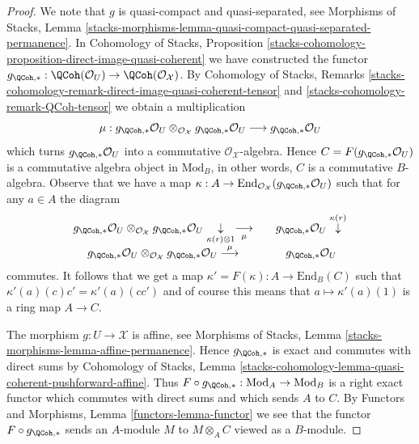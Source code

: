 \begin{proof}
We note that $g$ is quasi-compact and quasi-separated, see
Morphisms of Stacks, Lemma
\ref{stacks-morphisms-lemma-quasi-compact-quasi-separated-permanence}.
In Cohomology of Stacks, Proposition
\ref{stacks-cohomology-proposition-direct-image-quasi-coherent}
we have constructed the functor
$g_{\QCoh, *} : \QCoh(\mathcal{O}_U) \to \QCoh(\mathcal{O}_\mathcal{X})$.
By Cohomology of Stacks, Remarks
\ref{stacks-cohomology-remark-direct-image-quasi-coherent-tensor} and
\ref{stacks-cohomology-remark-QCoh-tensor}
we obtain a multiplication
$$
\mu :
g_{\QCoh, *}\mathcal{O}_U
\otimes_{\mathcal{O}_\mathcal{X}}
g_{\QCoh, *}\mathcal{O}_U
\longrightarrow
g_{\QCoh, *}\mathcal{O}_U
$$
which turns $g_{\QCoh, *}\mathcal{O}_U$ into a commutative
$\mathcal{O}_\mathcal{X}$-algebra. Hence $C = F(g_{\QCoh, *}\mathcal{O}_U)$
is a commutative algebra object in $\text{Mod}_B$, in other words, $C$ is a
commutative $B$-algebra. Observe that we have a map
$\kappa : A \to \text{End}_{\mathcal{O}_\mathcal{X}}(g_{\QCoh, *}\mathcal{O}_U)$
such that for any $a \in A$ the diagram
$$
\begin{array}{ccc}g_{\QCoh, *}\mathcal{O}_U \otimes_{\mathcal{O}_\mathcal{X}}
g_{\QCoh, *}\mathcal{O}_U
\underset{\kappa(r) \otimes 1}{\downarrow}\underset{\mu}{\longrightarrow} &  & g_{\QCoh, *}\mathcal{O}_U \overset{\kappa(r)}{\downarrow} \\ g_{\QCoh, *}\mathcal{O}_U \otimes_{\mathcal{O}_\mathcal{X}}
g_{\QCoh, *}\mathcal{O}_U
\overset{\mu}{\longrightarrow} &  & g_{\QCoh, *}\mathcal{O}_U\end{array}
$$
commutes. It follows that we get a map
$\kappa' = F(\kappa) : A \to \text{End}_B(C)$
such that $\kappa'(a)(c) c' = \kappa'(a)(cc')$ and of course this means that
$a \mapsto \kappa'(a)(1)$ is a ring map $A \to C$.

\medskip\noindent
The morphism $g : U \to \mathcal{X}$ is affine, see
Morphisms of Stacks, Lemma \ref{stacks-morphisms-lemma-affine-permanence}.
Hence $g_{\QCoh, *}$ is exact and commutes with direct sums by
Cohomology of Stacks, Lemma
\ref{stacks-cohomology-lemma-quasi-coherent-pushforward-affine}.
Thus $F \circ g_{\QCoh, *} : \text{Mod}_A \to \text{Mod}_B$
is a right exact functor which commutes with direct sums
and which sends $A$ to $C$.
By Functors and Morphisms, Lemma \ref{functors-lemma-functor}
we see that the functor $F \circ g_{\QCoh, *}$ sends an $A$-module
$M$ to $M \otimes_A C$ viewed as a $B$-module.
\end{proof}

